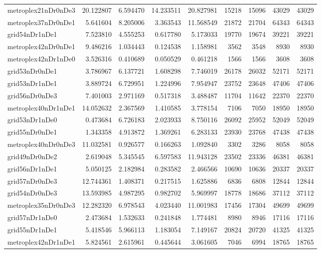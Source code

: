 \begin{longtable}{|l|r|r|r|r|r|r|r|r|}
metroplex21nDr0nDe3 & 20.122807 & 6.594470 & 14.233511 & 20.827981 & 15218 & 15096 & 43029 & 43029 \\
metroplex37nDr0nDe1 & 5.641604 & 8.205006 & 3.363543 & 11.568549 & 21872 & 21704 & 64343 & 64343 \\
grid54nDr1nDe1 & 7.523810 & 4.555253 & 0.617780 & 5.173033 & 19770 & 19674 & 39221 & 39221 \\
metroplex42nDr0nDe1 & 9.486216 & 1.034443 & 0.124538 & 1.158981 & 3562 & 3548 & 8930 & 8930 \\
metroplex42nDr1nDe0 & 3.526316 & 0.410689 & 0.050529 & 0.461218 & 1566 & 1566 & 3608 & 3608 \\
grid53nDr0nDe1 & 3.786967 & 6.137721 & 1.608298 & 7.746019 & 26178 & 26032 & 52171 & 52171 \\
grid53nDr1nDe1 & 3.889724 & 6.729951 & 1.224996 & 7.954947 & 23752 & 23648 & 47406 & 47406 \\
grid56nDr0nDe3 & 7.401003 & 2.971169 & 0.517318 & 3.488487 & 11704 & 11642 & 22370 & 22370 \\
metroplex40nDr1nDe1 & 14.052632 & 2.367569 & 1.410585 & 3.778154 & 7106 & 7050 & 18950 & 18950 \\
grid53nDr1nDe0 & 0.473684 & 6.726183 & 2.023933 & 8.750116 & 26092 & 25952 & 52049 & 52049 \\
grid55nDr0nDe1 & 1.343358 & 4.913872 & 1.369261 & 6.283133 & 23930 & 23768 & 47438 & 47438 \\
metroplex40nDr0nDe3 & 11.032581 & 0.926577 & 0.166263 & 1.092840 & 3302 & 3286 & 8058 & 8058 \\
grid49nDr0nDe2 & 2.619048 & 5.345545 & 6.597583 & 11.943128 & 23502 & 23336 & 46381 & 46381 \\
grid56nDr1nDe1 & 5.050125 & 2.182984 & 0.283582 & 2.466566 & 10690 & 10636 & 20337 & 20337 \\
grid57nDr0nDe3 & 12.744361 & 1.408371 & 0.217515 & 1.625886 & 6836 & 6808 & 12844 & 12844 \\
grid54nDr0nDe3 & 13.593985 & 4.987295 & 0.982702 & 5.969997 & 18778 & 18686 & 37112 & 37112 \\
metroplex35nDr0nDe3 & 12.282320 & 6.978543 & 4.023440 & 11.001983 & 17456 & 17304 & 49699 & 49699 \\
grid57nDr1nDe0 & 2.473684 & 1.532633 & 0.241848 & 1.774481 & 8980 & 8946 & 17116 & 17116 \\
grid55nDr1nDe1 & 5.418546 & 5.966113 & 1.183054 & 7.149167 & 20824 & 20720 & 41325 & 41325 \\
metroplex42nDr1nDe1 & 5.824561 & 2.615961 & 0.445644 & 3.061605 & 7046 & 6994 & 18765 & 18765 \\

\end{longtable}
